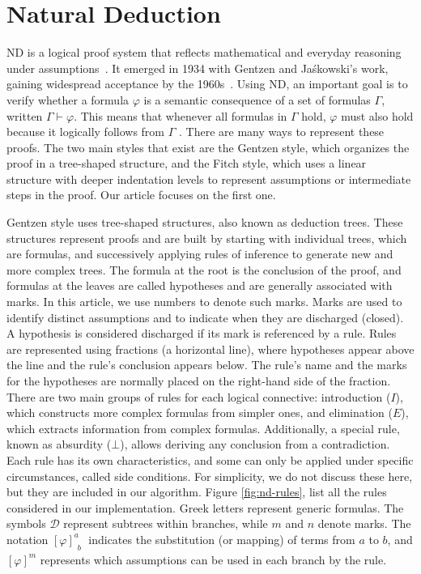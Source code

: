 \documentclass[runningheads]{llncs}
\begin{document}
\section{Natural Deduction}

ND is a logical proof system that reflects mathematical and everyday reasoning under assumptions~\cite{nd-mancosu}. It emerged in 1934 with Gentzen and Jaśkowski's work, gaining widespread acceptance by the 1960s~\cite{Pelletier1999-FRAABH}. Using ND, an important goal is to verify whether a formula \(\varphi\) is a semantic consequence of a set of formulas \(\Gamma\), written \(\Gamma \vdash \varphi\). This means that whenever all formulas in \(\Gamma\) hold, \(\varphi\) must also hold because it logically follows from \(\Gamma\) \cite{gouveia_lgica1, gouveia_lgica2}. There are many ways to represent these proofs. The two main styles that exist are the Gentzen style, which organizes the proof in a tree-shaped structure, and the Fitch style, which uses a linear structure with deeper indentation levels to represent assumptions or intermediate steps in the proof. Our article focuses on the first one. 

Gentzen style uses tree-shaped structures, also known as deduction trees. These structures represent proofs and are built by starting with individual trees, which are formulas, and successively applying rules of inference to generate new and more complex trees. The formula at the root is the conclusion of the proof, and formulas at the leaves are called hypotheses and are generally associated with marks. In this article, we use numbers to denote such marks. Marks are used to identify distinct assumptions and to indicate when they are discharged (closed). A hypothesis is considered discharged if its mark is referenced by a rule. Rules are represented using fractions (a horizontal line), where hypotheses appear above the line and the rule’s conclusion appears below. The rule’s name and the marks for the hypotheses are normally placed on the right-hand side of the fraction. There are two main groups of rules for each logical connective: introduction (\(I\)), which constructs more complex formulas from simpler ones, and elimination (\(E\)), which extracts information from complex formulas. Additionally, a special rule, known as absurdity (\(\bot\)), allows deriving any conclusion from a contradiction. Each rule has its own characteristics, and some can only be applied under specific circumstances, called side conditions. For simplicity, we do not discuss these here, but they are included in our algorithm. Figure \ref{fig:nd-rules}, list all the rules considered in our implementation. Greek letters represent generic formulas. The symbols \( \mathcal{D} \) represent subtrees within branches, while \( m \) and \( n \) denote marks. The notation \(\displaystyle \left[ \varphi \right]^a_{\substack{b}}\) indicates the substitution (or mapping) of terms from \( a \) to \( b \), and \(\displaystyle [\varphi]^m\) represents which assumptions can be used in each branch by the rule.
\end{document}
